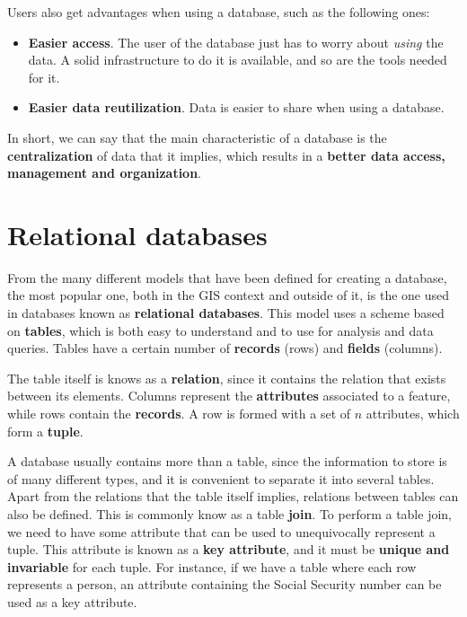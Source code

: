 Users also get advantages when using a database, such as the following ones:

\begin{itemize}
	\item \textbf{Easier access}. The user of the database just has to worry about \emph{using} the data. A solid infrastructure to do it is available, and so are the tools needed for it.
	\item \textbf{Easier data reutilization}. Data is easier to share when using a database.
\end{itemize}

In short, we can say that the main characteristic of a database is the \textbf{centralization} of data that it implies, which results in a \textbf{better data access, management and organization}.


\section{Relational databases}

From the many different models that have been defined for creating a database, the most popular one, both in the GIS context and outside of it, is the one used in databases known as \textbf{relational databases}. This model uses a scheme based on \textbf{tables}, which is both easy to understand and to use for analysis and data queries. Tables have a certain number of \textbf{records} (rows) and \textbf{fields} (columns).

The table itself is knows as a \textbf{relation}, since it contains the relation that exists between its elements. Columns represent the \textbf{attributes} associated to a feature, while rows contain the \textbf{records}. A row is formed with a set of $n$ attributes, which form a \textbf{tuple}.

A database usually contains more than a table, since the information to store is of many different types, and it is convenient to separate it into several tables. Apart from the relations that the table itself implies, relations between tables can also be defined. This is commonly know as a table \textbf{join}. To perform a table join, we need to have some attribute that can be used to unequivocally represent a tuple. This attribute is known as a \textbf{key attribute}, and it must be \textbf{unique and invariable} for each tuple. For instance, if we have a table where each row represents a person, an attribute containing the Social Security number can be used as a key attribute.

